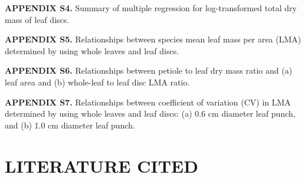 \documentclass[
  12pt,
  a4paper,
,tablecaptionabove
]{scrartcl}
\begin{document}
\textbf{APPENDIX S4.}
Summary of multiple regression for log-transformed total dry mass of leaf discs.

\textbf{APPENDIX S5.}
Relationships between species mean leaf mass per area (LMA) determined by using whole leaves and leaf discs.

\textbf{APPENDIX S6.}
Relationships between petiole to leaf dry mass ratio and (a) leaf area and (b) whole-leaf to leaf disc LMA ratio.

\textbf{APPENDIX S7.}
Relationships between coefficient of variation (CV) in LMA determined by using whole leaves and leaf discs: (a) 0.6 cm diameter leaf punch, and (b) 1.0 cm diameter leaf punch.

\hypertarget{literature-cited}{%
\section{LITERATURE CITED}\label{literature-cited}}
\end{document}
